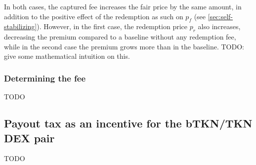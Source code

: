 \documentclass{article}
\begin{document}
In both cases, the captured fee increases the fair price by the same amount, in addition to the positive effect of the redemption as such on $p_f$ (see \ref{sec:self-stabilizing}). However, in the first case, the redemption price $p_r$ also increases, decreasing the premium compared to a baseline without any redemption fee, while in the second case the premium grows more than in the baseline. TODO: give some mathematical intuition on this.

\subsubsection{Determining the fee}
TODO

\subsection{Payout tax as an incentive for the bTKN/TKN DEX pair}
  \label{sec:payout-tax}
TODO
\end{document}
